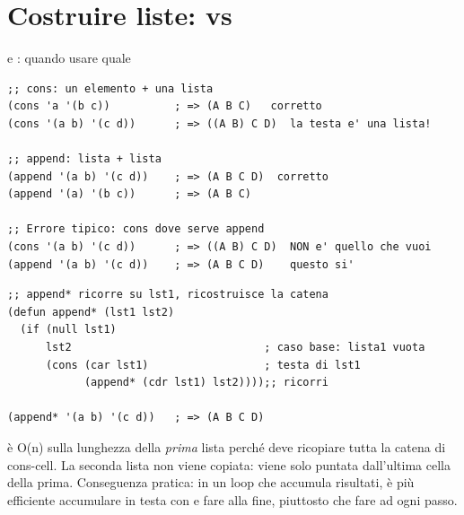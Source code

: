 \section{Costruire liste:  vs }

\begin{concetto}{ e : quando usare quale}

\boxsep
{}
\end{concetto}

\begin{esempio}
\begin{lstlisting}
;; cons: un elemento + una lista
(cons 'a '(b c))          ; => (A B C)   corretto
(cons '(a b) '(c d))      ; => ((A B) C D)  la testa e' una lista!

;; append: lista + lista
(append '(a b) '(c d))    ; => (A B C D)  corretto
(append '(a) '(b c))      ; => (A B C)

;; Errore tipico: cons dove serve append
(cons '(a b) '(c d))      ; => ((A B) C D)  NON e' quello che vuoi
(append '(a b) '(c d))    ; => (A B C D)    questo si'
\end{lstlisting}
\end{esempio}

\begin{esempio}
\begin{lstlisting}
;; append* ricorre su lst1, ricostruisce la catena
(defun append* (lst1 lst2)
  (if (null lst1)
      lst2                              ; caso base: lista1 vuota
      (cons (car lst1)                  ; testa di lst1
            (append* (cdr lst1) lst2))));; ricorri

(append* '(a b) '(c d))   ; => (A B C D)
\end{lstlisting}
\end{esempio}

\begin{nota}
 è O(n) sulla lunghezza della \emph{prima} lista perché deve
ricopiare tutta la catena di cons-cell. La seconda lista non viene
copiata: viene solo puntata dall'ultima cella della prima.
Conseguenza pratica: in un loop che accumula risultati, è più efficiente
accumulare in testa con  e fare  alla fine,
piuttosto che fare  ad ogni passo.
\end{nota}

